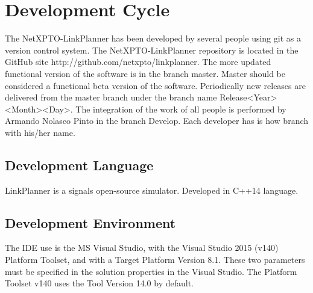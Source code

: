 
\chapter{Development Cycle}

The NetXPTO-LinkPlanner has been developed by several people using git as a version control system.
The NetXPTO-LinkPlanner repository is located in the GitHub site http://github.com/netxpto/linkplanner.
The more updated functional version of the software is in the branch master.
Master should be considered a functional beta version of the software.
Periodically new releases are delivered from the master branch under the branch name Release<Year><Month><Day>.
The integration of the work of all people is performed by Armando Nolasco Pinto in the branch Develop.
Each developer has is how branch with his/her name.

\section{Development Language}

LinkPlanner is a signals open-source simulator.
Developed in C++14 language.

\section{Development Environment}

The IDE use is the MS Visual Studio, with the Visual Studio 2015 (v140) Platform Toolset, and with a Target Platform Version 8.1.
These two parameters must be specified in the solution properties in the Visual Studio.
The Platform Toolset v140 uses the Tool Version 14.0 by default.



